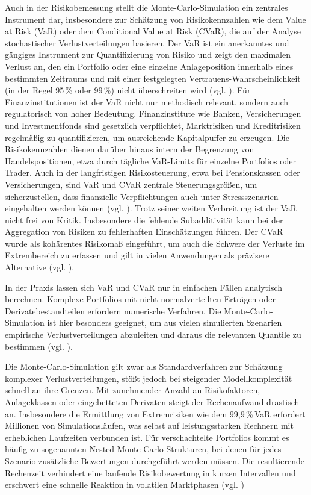Auch in der Risikobemessung stellt die Monte-Carlo-Simulation ein zentrales Instrument dar, insbesondere zur Schätzung von Risikokennzahlen wie dem Value at Risk (VaR) oder dem Conditional Value at Risk (CVaR), die auf der Analyse stochastischer Verlustverteilungen basieren. Der VaR ist ein anerkanntes und gängiges Instrument zur Quantifizierung von Risiko und zeigt den maximalen Verlust an, den ein Portfolio oder eine einzelne Anlageposition innerhalb eines bestimmten Zeitraums und mit einer festgelegten Vertrauens-Wahrscheinlichkeit (in der Regel 95\,\% oder 99\,\%) nicht überschreiten wird (vgl. \cite{martin_new_2025, bodnar_volatility-sensitive_2024}). 
Für Finanzinstitutionen ist der VaR nicht nur methodisch relevant, sondern auch regulatorisch von hoher Bedeutung. Finanzinstitute wie Banken, Versicherungen und Investmentfonds sind gesetzlich verpflichtet, Marktrisiken und Kreditrisiken regelmäßig zu quantifizieren, um ausreichende Kapitalpuffer zu erzeugen. Die Risikokennzahlen dienen darüber hinaus intern der Begrenzung von Handelspositionen, etwa durch tägliche VaR-Limits für einzelne Portfolios oder Trader. Auch in der langfristigen Risikosteuerung, etwa bei Pensionskassen oder Versicherungen, sind VaR und CVaR zentrale Steuerungsgrößen, um sicherzustellen, dass finanzielle Verpflichtungen auch unter Stressszenarien eingehalten werden können (vgl. \cite{orus_quantum_2019}).
Trotz seiner weiten Verbreitung ist der VaR nicht frei von Kritik. Insbesondere die fehlende Subadditivität kann bei der Aggregation von Risiken zu fehlerhaften Einschätzungen führen. Der CVaR wurde als kohärentes Risikomaß eingeführt, um auch die Schwere der Verluste im Extrembereich zu erfassen und gilt in vielen Anwendungen als präzisere Alternative (vgl. \cite{orus_quantum_2019}). 

In der Praxis lassen sich VaR und CVaR nur in einfachen Fällen analytisch berechnen. Komplexe Portfolios mit nicht-normalverteilten Erträgen oder Derivatebestandteilen erfordern numerische Verfahren. Die Monte-Carlo-Simulation ist hier besonders geeignet, um aus vielen simulierten Szenarien empirische Verlustverteilungen abzuleiten und daraus die relevanten Quantile zu bestimmen (vgl. \cite{zoufal_quantum_2019}).

Die Monte-Carlo-Simulation gilt zwar als Standardverfahren zur Schätzung komplexer Verlustverteilungen, stößt jedoch bei steigender Modellkomplexität schnell an ihre Grenzen. Mit zunehmender Anzahl an Risikofaktoren, Anlageklassen oder eingebetteten Derivaten steigt der Rechenaufwand drastisch an. Insbesondere die Ermittlung von Extremrisiken wie dem 99{,}9\,\%\,VaR erfordert Millionen von Simulationsläufen, was selbst auf leistungsstarken Rechnern mit erheblichen Laufzeiten verbunden ist. Für verschachtelte Portfolios kommt es häufig zu sogenannten Nested-Monte-Carlo-Strukturen, bei denen für jedes Szenario zusätzliche Bewertungen durchgeführt werden müssen. Die resultierende Rechenzeit verhindert eine laufende Risikobewertung in kurzen Intervallen und erschwert eine schnelle Reaktion in volatilen Marktphasen (vgl. \cite{bouland_prospects_2020, orus_quantum_2019})



